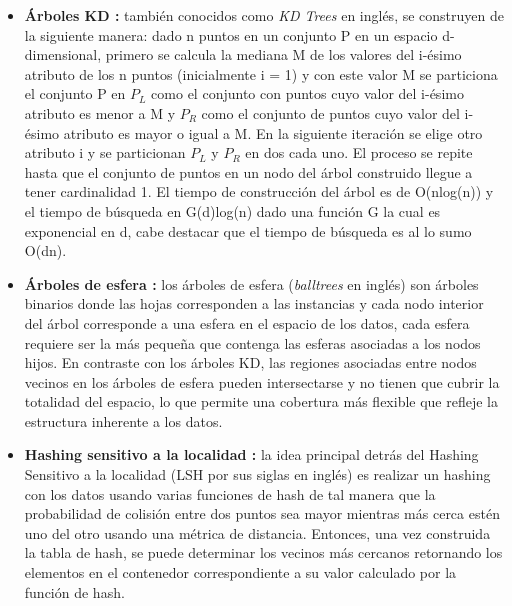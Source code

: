 \begin{itemize}
\item \textbf{Árboles KD \cite{shakhnarovich2006nearest,bentley1975multidimensional}:}
también conocidos como \emph{KD Trees} en inglés, se construyen de la siguiente manera: dado n puntos en un conjunto P en un espacio d-dimensional, primero se calcula la mediana M de los valores del i-ésimo atributo de los n puntos (inicialmente i = 1) y con este valor M se particiona el conjunto P en $P_L$ como el conjunto con puntos cuyo valor del i-ésimo atributo es menor a M y $P_R$ como el conjunto de puntos cuyo valor del i-ésimo atributo es mayor o igual a M. En la siguiente iteración se elige otro atributo i y se particionan $P_L$ y $P_R$ en dos cada uno. El proceso se repite hasta que el conjunto de puntos en un nodo del árbol construido llegue a tener cardinalidad 1. El tiempo de construcción del árbol es de O(nlog(n)) y el tiempo de búsqueda en G(d)log(n) dado una función G la cual es exponencial en d, cabe destacar que el tiempo de búsqueda es al lo sumo O(dn).

\item \textbf{Árboles de esfera \cite{shakhnarovich2006nearest,omohundro1989five,uhlmann1991satisfying}:}
los árboles de esfera (\emph{balltrees} en inglés) son árboles binarios donde las hojas corresponden a las instancias y cada nodo interior del árbol corresponde a una esfera en el espacio de los datos, cada esfera requiere ser la más pequeña que contenga las esferas asociadas a los nodos hijos. En contraste con los árboles KD, las regiones asociadas entre nodos vecinos en los árboles de esfera pueden intersectarse y no tienen que cubrir la totalidad del espacio, lo que permite una cobertura más flexible que refleje la estructura inherente a los datos.

\item \textbf{Hashing sensitivo a la localidad \cite{shakhnarovich2006nearest,indyk2004nearest}:}
la idea principal detrás del Hashing Sensitivo a la localidad (LSH por sus siglas en inglés) es realizar un hashing con los datos usando varias funciones de hash de tal manera que la probabilidad de colisión entre dos puntos sea mayor mientras más cerca estén uno del otro usando una métrica de distancia. Entonces, una vez construida la tabla de hash, se puede determinar los vecinos más cercanos retornando los elementos en el contenedor correspondiente a su valor calculado por la función de hash.
\end{itemize}

